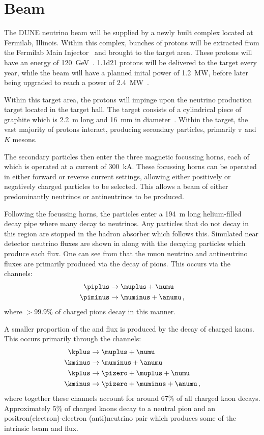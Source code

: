\section{Beam}
\label{sec:dune:beam}

The DUNE neutrino beam will be supplied by a newly built complex located at Fermilab, Illinois.
Within this complex, bunches of protons will be extracted from the Fermilab Main Injector~\cite{mainInjector} and brought to the target area.
These protons will have an energy of \SI{120}{\giga\electronvolt}~\cite{duneBeam}.
\num{1.1d21} protons will be delivered to the target every year, while the beam will have a planned inital power of \SI{1.2}{\mega\watt}, before later being upgraded to reach a power of \SI{2.4}{\mega\watt}~\cite{duneBeam}.

Within this target area, the protons will impinge upon the neutrino production target located in the target hall.
The target consists of a cylindrical piece of graphite which is \SI{2.2}{\metre} long and \SI{16}{\milli\metre} in diameter~\cite{duneBeam}.
Within the target, the vast majority of protons interact, producing secondary particles, primarily $\pi$ and $K$ mesons.

The secondary particles then enter the three magnetic focussing horns, each of which is operated at a current of \SI{300}{\kilo\ampere}.
These focussing horns can be operated in either forward or reverse current settings, allowing either positively or negatively charged particles to be selected.
This allows a beam of either predominantly neutrinos or antineutrinos to be produced.

Following the focussing horns, the particles enter a \SI{194}{\metre} long helium-filled decay pipe where many decay to neutrinos.
Any particles that do not decay in this region are stopped in the hadron absorber which follows this.
Simulated near detector neutrino fluxes are shown in  along with the decaying particles which produce each flux.
One can see from  that the muon neutrino and antineutrino fluxes are primarily produced via the decay of pions.
This occurs via the channels:
\begin{align}
  \piplus &\rightarrow \muplus + \numu \\
  \piminus &\rightarrow \muminus + \anumu \, ,
\end{align}
where $>99.9\%$ of charged pions decay in this manner.

A smaller proportion of the \numu and \anumu flux is produced by the decay of charged kaons.
This occurs primarily through the channels:
\begin{align}
  \kplus &\rightarrow \muplus + \numu \\
  \kminus &\rightarrow \muminus + \anumu \\
  \kplus &\rightarrow \pizero + \muplus + \numu \\
  \kminus &\rightarrow \pizero + \muminus + \anumu \, ,
\end{align}
where together these channels account for around 67\% of all charged kaon decays.
Approximately 5\% of charged kaons decay to a neutral pion and an positron(electron)-electron (anti)neutrino pair which produces some of the intrinsic beam \nue and \anue flux.

